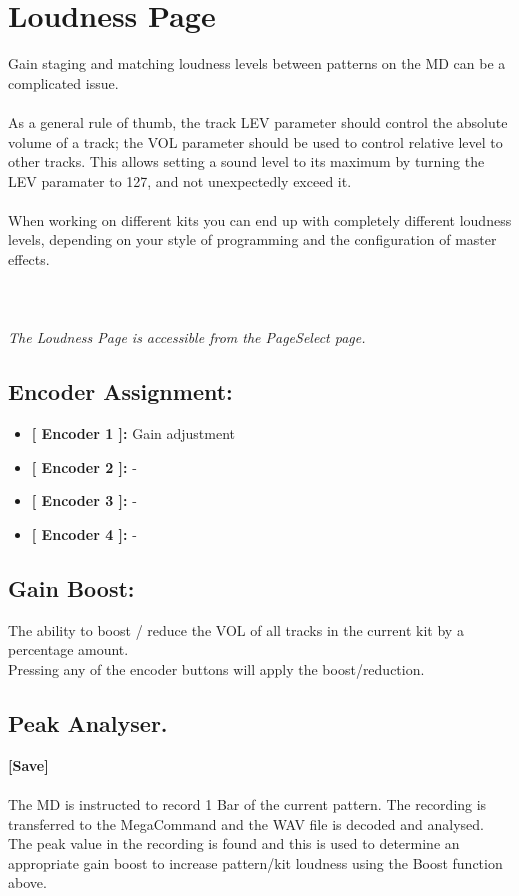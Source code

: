 \chapter{Loudness Page}
Gain staging and matching loudness levels between patterns on the MD can be a complicated issue.\\
\\
As a general rule of thumb, the track LEV parameter should control the absolute volume of a track; the VOL parameter should be used to control relative level to other tracks. This allows setting a sound level to its maximum by turning the LEV paramater to 127, and not unexpectedly exceed it.\\
\\
When working on different kits you can end up with completely different loudness levels, depending on your style of programming and the configuration of master effects.\\\\
\\\\\textit{The Loudness Page is accessible from the PageSelect page.}
\section{Encoder Assignment:}
\begin{itemize}
	\item \textbf{[ Encoder 1 ]: } Gain adjustment
	\item \textbf{[ Encoder 2 ]: } -
    \item \textbf{[ Encoder 3 ]: } -
	\item \textbf{[ Encoder 4 ]: } -
\end{itemize}

\section{Gain Boost:}
The ability to boost / reduce the VOL of all tracks in the current kit by a percentage amount.
\\Pressing any of the encoder buttons will apply the boost/reduction.

\section{Peak Analyser.}
\textbf{[Save]}\\\\
The MD is instructed to record 1 Bar of the current pattern. The recording is transferred to the MegaCommand and the WAV file is decoded and analysed. The peak value in the recording is found and this is used to determine an appropriate gain boost to increase pattern/kit loudness using the Boost function above.